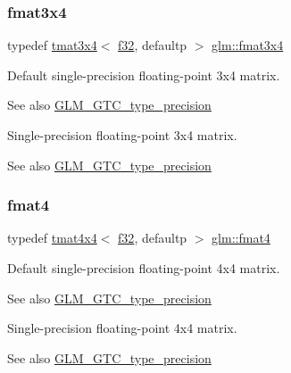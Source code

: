 \subsubsection{\texorpdfstring{fmat3x4}{fmat3x4}}
{\footnotesize\ttfamily typedef \hyperlink{structglm_1_1tmat3x4}{tmat3x4}$<$ \hyperlink{group__gtc__type__precision_ga0ec999b57f5330d9021256e96038df04}{f32}, defaultp $>$ \hyperlink{group__gtc__type__precision_gad68d9daa91ef05b29e80e044931837cf}{glm\+::fmat3x4}}

Default single-\/precision floating-\/point 3x4 matrix. \begin{DoxySeeAlso}{See also}
\hyperlink{group__gtc__type__precision}{G\+L\+M\+\_\+\+G\+T\+C\+\_\+type\+\_\+precision}
\end{DoxySeeAlso}
Single-\/precision floating-\/point 3x4 matrix. \begin{DoxySeeAlso}{See also}
\hyperlink{group__gtc__type__precision}{G\+L\+M\+\_\+\+G\+T\+C\+\_\+type\+\_\+precision} 
\end{DoxySeeAlso}
\mbox{\label{group__gtc__type__precision_ga5a7b9713c32b3e8bf6ad41fce25f3205}} 
\subsubsection{\texorpdfstring{fmat4}{fmat4}}
{\footnotesize\ttfamily typedef \hyperlink{structglm_1_1tmat4x4}{tmat4x4}$<$ \hyperlink{group__gtc__type__precision_ga0ec999b57f5330d9021256e96038df04}{f32}, defaultp $>$ \hyperlink{group__gtc__type__precision_ga5a7b9713c32b3e8bf6ad41fce25f3205}{glm\+::fmat4}}

Default single-\/precision floating-\/point 4x4 matrix. \begin{DoxySeeAlso}{See also}
\hyperlink{group__gtc__type__precision}{G\+L\+M\+\_\+\+G\+T\+C\+\_\+type\+\_\+precision}
\end{DoxySeeAlso}
Single-\/precision floating-\/point 4x4 matrix. \begin{DoxySeeAlso}{See also}
\hyperlink{group__gtc__type__precision}{G\+L\+M\+\_\+\+G\+T\+C\+\_\+type\+\_\+precision} 
\end{DoxySeeAlso}
\mbox{\label{group__gtc__type__precision_ga9325d382b334066a4c90a814c9040359}} 
